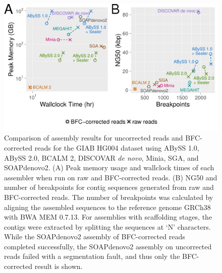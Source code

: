 \documentclass[
  12pt,
  oneside,
  openany]{book}
\begin{document}
\begin{appendices}
\begin{figure}
\hypertarget{fig:raw}{%
\centering
\includegraphics{abyss2-appendix/raw-vs-bfc.png}
\caption[Comparison of assembly results for uncorrected reads and BFC-corrected reads for the GIAB HG004 dataset using ABySS 1.0, ABySS 2.0, BCALM 2, DISCOVAR \emph{de novo}, Minia, SGA, and SOAPdenovo2.]{Comparison of assembly results for uncorrected reads and BFC-corrected reads for the GIAB HG004 dataset using ABySS 1.0, ABySS 2.0, BCALM 2, DISCOVAR \emph{de novo}, Minia, SGA, and SOAPdenovo2. (A) Peak memory usage and wallclock times of each assembler when run on raw and BFC-corrected reads. (B) NG50 and number of breakpoints for contig sequences generated from raw and BFC-corrected reads. The number of breakpoints was calculated by aligning the assembled sequences to the reference genome GRCh38 with BWA MEM 0.7.13. For assemblies with scaffolding stages, the contigs were extracted by splitting the sequences at `N' characters. While the SOAPdenovo2 assembly of BFC-corrected reads completed successfully, the SOAPdenovo2 assembly on uncorrected reads failed with a segmentation fault, and thus only the BFC-corrected result is shown.}\label{fig:raw}
}
\end{figure}


\end{appendices}
\end{document}

